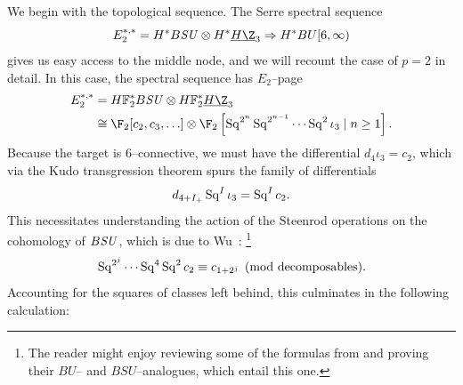 We begin with the topological sequence.
The Serre spectral sequence \[E_2^{*, *} = H^* B\SU \otimes H^* \OS{H\Z}{3} \Rightarrow H^* BU[6, \infty)\] gives us easy access to the middle node, and we will recount the case of \(p = 2\) in detail.
In this case, the spectral sequence has \(E_2\)--page
\begin{align*}
E_2^{*, *} & = \HFtwo^* B\SU \otimes \HFtwo^* \OS{H\Z}{3} \\
& \cong \F_2[c_2, c_3, \ldots] \otimes \F_2\left[\Sq^{2^n} \Sq^{2^{n-1}} \cdots \Sq^2 \iota_3 \mid n \ge 1 \right].
\end{align*}
Because the target is \(6\)--connective, we must have the differential \(d_4 \iota_3 = c_2\), which via the Kudo transgression theorem spurs the family of differentials \[d_{4+I_+} \operatorname{Sq}^I \iota_3 = \operatorname{Sq}^I c_2.\]
This necessitates understanding the action of the Steenrod operations on the cohomology of \(B\mathit{SU}\), which is due to Wu~\cite[Section 23.6]{MayConciseCourse}:%
\footnote{%
The reader might enjoy reviewing some of the formulas from  and proving their \(BU\)-- and \(BSU\)--analogues, which entail this one.
}
\[\operatorname{Sq}^{2^j} \cdots \operatorname{Sq}^4 \operatorname{Sq}^2 c_2 \equiv c_{1 + 2^j} \pmod{\text{decomposables}}.\]
Accounting for the squares of classes left behind, this culminates in the following calculation:

